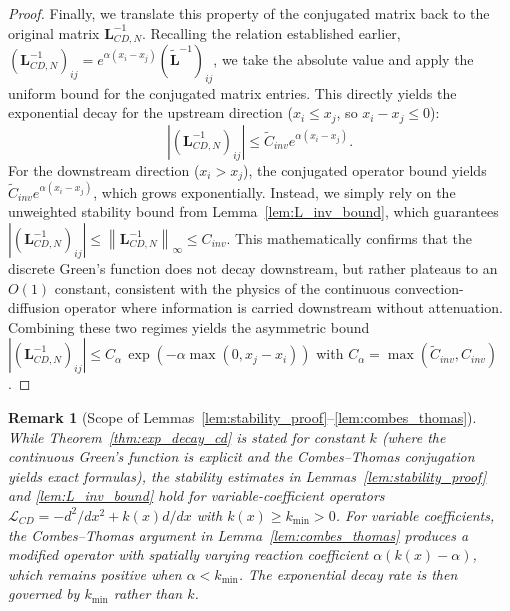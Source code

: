 \documentclass[pdflatex,sn-mathphys-num]{sn-jnl}%
\theoremstyle{thmstyleone}%
\newtheorem{remark}{Remark}
\newcommand{\norm}[1]{\left\lVert#1\right\rVert}
\newcommand{\mat}[1]{\mathbf{#1}}
\begin{document}
\begin{proof}
Finally, we translate this property of the conjugated matrix back to the original matrix $\mat{L}_{CD,N}^{-1}$. Recalling the relation established earlier, $(\mat{L}_{CD,N}^{-1})_{ij} = e^{\alpha(x_i - x_j)} (\widetilde{\mat{L}}^{-1})_{ij}$, we take the absolute value and apply the uniform bound for the conjugated matrix entries. This directly yields the exponential decay for the upstream direction ($x_i \le x_j$, so $x_i-x_j \le 0$):
\begin{equation}
|(\mat{L}_{CD,N}^{-1})_{ij}| \le \tilde{C}_{inv} e^{\alpha (x_i-x_j)}.
\end{equation}
For the downstream direction ($x_i > x_j$), the conjugated operator bound yields $\tilde{C}_{inv} e^{\alpha(x_i - x_j)}$, which grows exponentially. Instead, we simply rely on the unweighted stability bound from Lemma~\ref{lem:L_inv_bound}, which guarantees $|(\mat{L}_{CD,N}^{-1})_{ij}| \le \norm{\mat{L}_{CD,N}^{-1}}_\infty \le C_{inv}$. 
This mathematically confirms that the discrete Green's function does not decay downstream, but rather plateaus to an $O(1)$ constant, consistent with the physics of the continuous convection-diffusion operator where information is carried downstream without attenuation.
Combining these two regimes yields the asymmetric bound $|(\mat{L}_{CD,N}^{-1})_{ij}| \le C_{\alpha}\, \exp(-\alpha \max(0, x_j - x_i))$ with $C_\alpha = \max(\tilde{C}_{inv}, C_{inv})$.
\end{proof}

\begin{remark}[Scope of Lemmas~\ref{lem:stability_proof}--\ref{lem:combes_thomas}]
\label{rem:variable_k}
While Theorem~\ref{thm:exp_decay_cd} is stated for constant $k$ (where the continuous Green's function is explicit and the Combes--Thomas conjugation yields exact formulas), the stability estimates in Lemmas~\ref{lem:stability_proof} and \ref{lem:L_inv_bound} hold for variable-coefficient operators $\mathcal{L}_{CD} = -d^2/dx^2 + k(x)d/dx$ with $k(x) \ge k_{\min} > 0$. For variable coefficients, the Combes--Thomas argument in Lemma~\ref{lem:combes_thomas} produces a modified operator with spatially varying reaction coefficient $\alpha(k(x) - \alpha)$, which remains positive when $\alpha < k_{\min}$. The exponential decay rate is then governed by $k_{\min}$ rather than $k$.
\end{remark}
\end{document}
